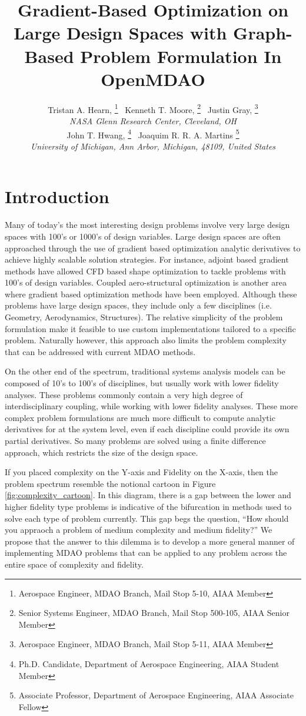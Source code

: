 \documentclass[]{aiaa-tc} %
\title{Gradient-Based Optimization on Large Design Spaces with Graph-Based Problem Formulation In OpenMDAO}
\author{
  Tristan A. Hearn,%
     \thanks{Aerospace Engineer, MDAO Branch, Mail Stop 5-10, AIAA Member}
  \ Kenneth T. Moore,%
     \thanks{Senior Systems Engineer, MDAO Branch, Mail Stop 500-105, AIAA Senior Member}
  \ Justin Gray,%
     \thanks{Aerospace Engineer, MDAO Branch, Mail Stop 5-11, AIAA Member}
   \\
  {\normalsize\itshape
  NASA Glenn Research Center, Cleveland, OH}  \\
  John T. Hwang,%
  \thanks{Ph.D. Candidate, Department of Aerospace Engineering, AIAA Student Member}
  \ Joaquim R. R. A. Martins%
  \thanks{Associate Professor, Department of Aerospace Engineering, AIAA Associate Fellow}
  \\
  {\normalsize\itshape
   University of Michigan, Ann Arbor, Michigan, 48109, United States}
}
\begin{document}
  \maketitle

  \begin{abstract}

  \end{abstract}

  \section{Introduction}

    Many of today's the most interesting design problems involve very large design spaces with 100's or 1000's of
    design variables. Large design spaces are often approached through the use of gradient based optimization
    analytic derivatives to achieve highly scalable solution strategies. For instance, adjoint based gradient
    methods have allowed CFD based shape optimization to tackle problems with 100's of design variables\cite{SU2_2013}. 
    Coupled aero-structural optimization is another area where gradient based optimization methods have
    been employed\cite{Kenway2012c, Haghighat:2011:ADO}. Although these problems have large design spaces,
    they include only a few disciplines (i.e. Geometry, Aerodynamics, Structures). The relative simplicity of
    the problem formulation make it feasible to use custom implementations tailored to a specific problem. Naturally however,
    this approach also limits the problem complexity that can be addressed with current MDAO methods.

    On the other end of the spectrum, traditional systems analysis models can be composed of 10's to 100's of disciplines,
    but usually work with lower fidelity analyses. These problems commonly contain a very high degree of interdisciplinary
    coupling, while working with lower fidelity analyses. These more complex problem formulations are much more difficult to compute
    analytic derivatives for at the system level, even if each discipline could provide its own partial derivatives. So many
    problems are solved using a finite difference approach, which restricts the size of the design space.

    If you placed complexity on the Y-axis and Fidelity on the X-axis, then the problem spectrum resemble the notional
    cartoon in Figure \ref{fig:complexity_cartoon}. In this diagram, there is a gap between the lower and higher fidelity
    type problems is indicative of the bifurcation in methods used to solve each type of problem currently. This gap begs the
    question, ``How should you appraoch a problem of medium complexity and medium fidelity?'' We propose that the answer to this
    dilemma is to develop a more general manner of implementing MDAO problems that can be applied to any problem across the entire
    space of complexity and fidelity.
\end{document}
